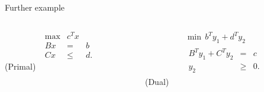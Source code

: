 \begin{frame}{Further example}



  
  \begin{columns}
    \begin{column}{.5\textwidth}
      \begin{equation*}
        \begin{array}{rcl}
          \max &c^Tx \\
          Bx &  =&  b\\
          Cx & \leq & d. 
        \end{array}
      \end{equation*}
      (Primal)
    \end{column}
    \begin{column}{.5\textwidth}
      \begin{equation*}
        \begin{array}{c}
          \min \, b^Ty_1 + d^T y_2 \\
          \begin{array}{rcl}
            B^Ty_1 + C^T  y_2 & = &  c \\  y_2& \geq & 0. 
          \end{array}
        \end{array}
      \end{equation*}
      (Dual)
    \end{column}       
  \end{columns}
\end{frame}





\begin{frame}{}

  \begin{columns}
    \begin{column}{.5\textwidth}
      
    \end{column}
    \begin{column}{.5\textwidth}
      
    \end{column}       
  \end{columns}
\end{frame}



